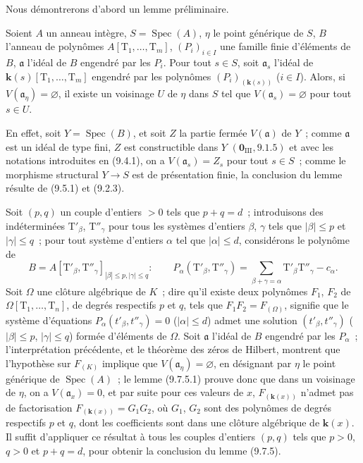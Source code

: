 Nous démontrerons d'abord un lemme préliminaire.

\begin{lemma}[9.7.5.1]
\label{IV.9.7.5.1-fr}
Soient $A$ un anneau intègre, $S=\operatorname{Spec}(A)$, $\eta$ le point
générique de $S$, $B$ l'anneau de polynômes
$A[\mathrm T_1,\ldots,\mathrm T_m]$, $(P_i)_{i\in I}$ une famille finie
d'éléments de $B$, $\mathfrak a$ l'idéal de $B$ engendré par les $P_i$. Pour
tout $s\in S$, soit $\mathfrak a_s$ l'idéal de
$\boldsymbol{k}(s)[\mathrm T_1,\ldots,\mathrm T_m]$ engendré par les polynômes
$(P_i)_{(\boldsymbol{k}(s))}$ ($i\in I$). Alors, si
$V(\mathfrak a_\eta)=\varnothing$, il existe un voisinage $U$ de $\eta$ dans
$S$ tel que $V(\mathfrak a_s)=\varnothing$ pour tout $s\in U$.
\end{lemma}

En effet, soit $Y=\operatorname{Spec}(B)$, et soit $Z$ la partie fermée
$V(\mathfrak a)$ de $Y$~; comme $\mathfrak a$ est un idéal de type fini, $Z$
est constructible dans $Y$ $(\mathbf 0_{\mathrm{III}},9.1.5)$ et avec les
notations introduites en (9.4.1), on a $V(\mathfrak a_s)=Z_s$ pour tout
$s\in S$~; comme le morphisme structural $Y\to S$ est de présentation finie,
la conclusion du lemme résulte de (9.5.1) et (9.2.3).


Soit $(p,q)$ un couple d'entiers $>0$ tels que $p+q=d$~; introduisons des
indéterminées $\mathrm T'_\beta$, $\mathrm T''_\gamma$ pour tous les systèmes
d'entiers $\beta$, $\gamma$ tels que $|\beta|\leqslant p$ et
$|\gamma|\leqslant q$~; pour tout système d'entiers $\alpha$ tel que
$|\alpha|\leqslant d$, considérons le polynôme de
\[
B=A[\mathrm T'_\beta,\mathrm T''_\gamma]_{|\beta|\leqslant p,
  |\gamma|\leqslant q}:
\qquad
P_\alpha(\mathrm T'_\beta,\mathrm T''_\gamma)
=\sum_{\beta+\gamma=\alpha}\mathrm T'_\beta\mathrm T''_\gamma-c_\alpha.
\]
Soit $\Omega$ une clôture algébrique de $K$~; dire qu'il existe deux polynômes
$F_1$, $F_2$ de $\Omega[\mathrm T_1,\ldots,\mathrm T_n]$, de degrés respectifs
$p$ et $q$, tels que $F_1F_2=F_{(\Omega)}$, signifie que le système d'équations
$P_\alpha(t'_\beta,t''_\gamma)=0$ ($|\alpha|\leqslant d$) admet une solution
$(t'_\beta,t''_\gamma)$ ($|\beta|\leqslant p$, $|\gamma|\leqslant q$) formée
d'éléments de $\Omega$. Soit $\mathfrak a$ l'idéal de $B$ engendré par les
$P_\alpha$~; l'interprétation précédente, et le théorème des zéros de Hilbert,
montrent que l'hypothèse sur $F_{(K)}$ implique que
$V(\mathfrak a_\eta)=\varnothing$, en désignant par $\eta$ le point générique de
$\operatorname{Spec}(A)$~; le lemme (9.7.5.1) prouve donc que dans un voisinage
de $\eta$, on a $V(\mathfrak a_x)=0$, et par suite pour ces valeurs de $x$,
$F_{(\boldsymbol{k}(x))}$ n'admet pas de factorisation
$F_{(\boldsymbol{k}(x))}=G_1G_2$, où $G_1$, $G_2$ sont des polynômes de degrés
respectifs $p$ et $q$, dont les coefficients sont dans une clôture algébrique
de $\boldsymbol{k}(x)$. Il suffit d'appliquer ce résultat à tous les couples
d'entiers $(p,q)$ tels que $p>0$, $q>0$ et $p+q=d$, pour obtenir la conclusion
du lemme (9.7.5).

